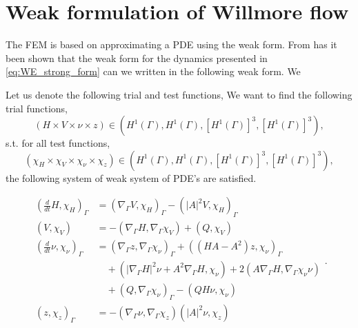 \section{Weak formulation of Willmore flow}%
\label{sub:weak_formulation}

The FEM is based on approximating a PDE using the weak form.
From \cite{kovacs2021convergent} has it been shown that the weak form for the dynamics presented in \eqref{eq:WE_strong_form} can we written in the following weak form. We

Let us denote the following trial and test functions,
We want to find the following trial functions,
\[
( H \times V \times \nu  \times z ) \in    \left( H^{1}\left( \Gamma  \right), H^1 \left( \Gamma  \right), \left[ H^{1} \left( \Gamma  \right)  \right] ^3, \left[ H^{1}\left( \Gamma  \right)  \right]^3   \right),
\]
s.t. for all test functions,
\[
( \chi_{H}  \times \chi _{V} \times \chi _{\nu }  \times \chi _{z} ) \in    \left( H^{1}\left( \Gamma  \right), H^1 \left( \Gamma  \right), \left[ H^{1} \left( \Gamma  \right)  \right] ^3, \left[ H^{1}\left( \Gamma  \right)  \right]^3   \right),
\]
the following system of weak system of PDE's are satisfied.

\begin{equation}
\label{eq:WE_weak_form}
\begin{split}
\left( \frac{d}{dt}H, \chi _{H} \right)_{\Gamma } &=  \left( \nabla _{\Gamma } V, \chi _{H} \right) _{\Gamma } - \left( \left\lvert A \right\rvert ^2 V, \chi _{H} \right) _{\Gamma }   \\
\left( V, \chi _{V} \right) &= -\left( \nabla _{\Gamma } H, \nabla _{\Gamma } \chi _{V} \right) + \left( Q, \chi _{V} \right)   \\
\left( \frac{d}{dt} \nu , \chi _{\nu } \right)_{\Gamma } &= \left( \nabla _{\Gamma }z, \nabla _{\Gamma } \chi _{\nu } \right) _{\Gamma } + \left( ( HA - A^2  )z,\chi_\nu  \right)_{\Gamma }   \\
& \quad  + \left( \left\lvert \nabla _{\Gamma } H \right\rvert^2 \nu + A^2\nabla _{\Gamma } H, \chi _{\nu }  \right) + 2 \left( A \nabla _{\Gamma } H, \nabla _{\Gamma } \chi _{\nu } \nu  \right)   \\
 & \quad + \left( Q, \nabla _{\Gamma } \chi _{\nu }  \right)_{\Gamma } - \left( QH\nu , \chi _{\nu } \right) \\
\left( z, \chi _{z} \right) _{\Gamma }  &= - \left( \nabla _{\Gamma } \nu , \nabla _{\Gamma } \chi _{z} \right) \left( \left\lvert A \right\rvert ^2 \nu , \chi _{z} \right)    \\
\end{split}
.\end{equation}













